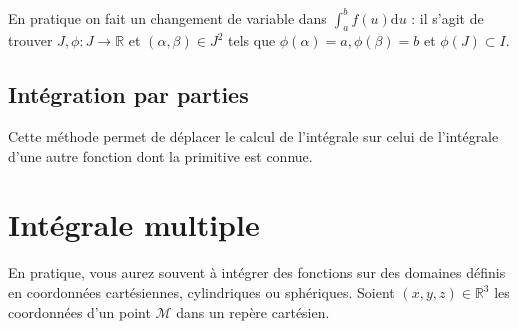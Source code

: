 
En pratique on fait un changement de variable dans $\int_a^b f(u) \mathrm{d} u$ : il s'agit de trouver $J, \phi: J \rightarrow \mathbb{R}$ et $(\alpha, \beta) \in J^2$ tels que $\phi(\alpha)=a, \phi(\beta)=b$ et $\phi(J) \subset I$.

\subsection{Intégration par parties}


Cette méthode permet de déplacer le calcul de l'intégrale sur celui de l'intégrale d'une autre fonction dont la primitive est connue.

\section{Intégrale multiple}


En pratique, vous aurez souvent à intégrer des fonctions sur des domaines définis en coordonnées cartésiennes, cylindriques ou sphériques. Soient $(x, y, z) \in \mathbb{R}^3$ les coordonnées d'un point $\mathcal{M}$ dans un repère cartésien. 

